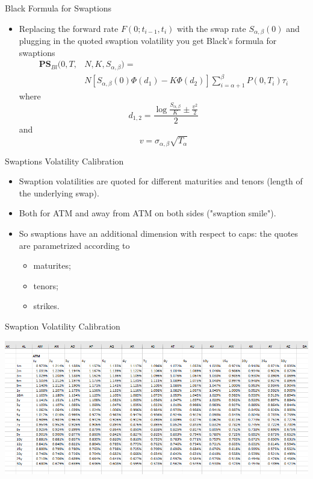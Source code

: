 \documentclass{beamer}
\begin{document}
\begin{frame}{Black Formula for Swaptions}
\begin{itemize}
	\item Replacing the forward rate $F(0;t_{i-1},t_i)$ with the swap rate $S_{\alpha,\beta}(0)$ and plugging in the quoted swaption volatility you get Black's formula for swaptions
	\begin{equation}
		\begin{aligned}
			\textbf{PS}_{Bl}(0,T,&N,K,S_{\alpha,\beta})=\\
			&N\left[S_{\alpha,\beta}(0)\Phi(d_1)-K\Phi(d_2)\right]\sum_{i=\alpha+1}^\beta P(0,T_i)\tau_i
		\end{aligned}	
	\end{equation}
	where
	\begin{equation*}
		d_{1,2} = \frac{\log{\frac{S_{\alpha,\beta}}{K}} \pm \frac{v^2}{2}}{2}
	\end{equation*}
	and
	\begin{equation*}
		v = \sigma_{\alpha,\beta}\sqrt{T_\alpha}
	\end{equation*}
\end{itemize}
\end{frame}

\begin{frame}{Swaptions Volatility Calibration}
\begin{itemize}
	\item Swaption volatilities are quoted for different maturities and tenors (length of the underlying swap).
	\item Both for ATM and away from ATM on both sides ("swaption smile").
	\item So swaptions have an additional dimension with respect to caps: the quotes are parametrized according to 
	\begin{itemize}
		\item maturites;
		\item tenors;
		\item strikes.
	\end{itemize}
\end{itemize}
\end{frame}

\begin{frame}{Swaption Volatility Calibration}
  \begin{center}
    \includegraphics[width=1.\linewidth]{atm_vol}
  \end{center}
\end{frame}
\end{document}
